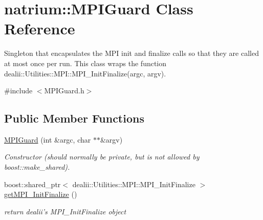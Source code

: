 \hypertarget{classnatrium_1_1MPIGuard}{
\section{natrium::MPIGuard Class Reference}
\label{classnatrium_1_1MPIGuard}
}


Singleton that encapsulates the MPI init and finalize calls so that they are called at most once per run. This class wraps the function dealii::Utilities::MPI::MPI\_\-InitFinalize(argc, argv).  


{\ttfamily \#include $<$MPIGuard.h$>$}\subsection*{Public Member Functions}
\begin{DoxyCompactItemize}
\item 
\hypertarget{classnatrium_1_1MPIGuard_a1e07fafea3f7724d0d2dd9c106e1a44b}{
\hyperlink{classnatrium_1_1MPIGuard_a1e07fafea3f7724d0d2dd9c106e1a44b}{MPIGuard} (int \&argc, char $\ast$$\ast$\&argv)}
\label{classnatrium_1_1MPIGuard_a1e07fafea3f7724d0d2dd9c106e1a44b}

\begin{DoxyCompactList}\small\item\em Constructor (should normally be private, but is not allowed by boost::make\_\-shared). \item\end{DoxyCompactList}\item 
\hypertarget{classnatrium_1_1MPIGuard_a4df8a28efa88e97a77ee0dc9a74a1a17}{
boost::shared\_\-ptr$<$ dealii::Utilities::MPI::MPI\_\-InitFinalize $>$ \hyperlink{classnatrium_1_1MPIGuard_a4df8a28efa88e97a77ee0dc9a74a1a17}{getMPI\_\-InitFinalize} ()}
\label{classnatrium_1_1MPIGuard_a4df8a28efa88e97a77ee0dc9a74a1a17}

\begin{DoxyCompactList}\small\item\em return dealii's MPI\_\-InitFinalize object \item\end{DoxyCompactList}\end{DoxyCompactItemize}

